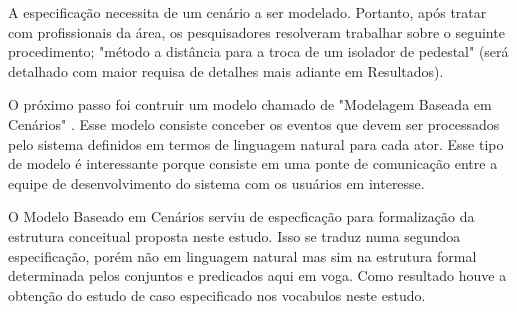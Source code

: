 A especificação necessita de um cenário a ser modelado. Portanto, após tratar com profissionais da área, os pesquisadores resolveram trabalhar sobre o seguinte procedimento; "método a distância para a troca de um isolador de pedestal" (será detalhado com maior requisa de detalhes mais adiante em Resultados).

O próximo passo foi contruir um modelo chamado de "Modelagem Baseada em Cenários" \cite{softwareeng}. Esse modelo consiste conceber os eventos que devem ser processados pelo sistema definidos em termos de linguagem natural para cada ator. Esse tipo de modelo é interessante porque consiste em uma ponte de comunicação entre a equipe de desenvolvimento do sistema com os usuários em interesse.     

O Modelo Baseado em Cenários serviu de especficação para formalização da estrutura conceitual proposta neste estudo. Isso se traduz numa segundoa especificação, porém não em linguagem natural mas sim na estrutura formal determinada pelos conjuntos e predicados aqui em voga. Como resultado houve a obtenção do estudo de caso especificado nos vocabulos neste estudo.